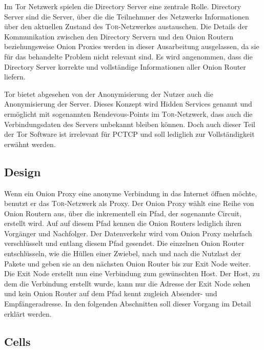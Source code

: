 \documentclass[fleqn,envcountsame,runningheads,10pt,a4paper]{llncs}
\begin{document}
Im Tor Netzwerk spielen die Directory Server eine zentrale Rolle.
Directory Server sind die Server, über die die Teilnehmner des Netzwerks Informationen über den aktuellen Zustand des \textsc{Tor}-Netzwerkes austauschen.
Die Details der Kommunikation zwischen den Directory Servern und den Onion Routern beziehungsweise Onion Proxies werden in dieser Ausarbeitung ausgelassen, da sie für das behandelte Problem nicht relevant sind.
Es wird angenommen, dass die Directory Server korrekte und vollständige Informationen aller Onion Router liefern.

Tor bietet abgesehen von der Anonymisierung der Nutzer auch die Anonymisierung der Server. 
Dieses Konzept wird Hidden Services genannt und ermöglicht mit sogenannten Rendevous-Points im \textsc{Tor}-Netzwerk, dass auch die Verbindungsdaten des Servers unbekannt bleiben können.
Doch auch dieser Teil der Tor Software ist irrelevant für PCTCP und soll lediglich zur Vollständigkeit erwähnt werden.



\subsection{Design}

Wenn ein Onion Proxy eine anonyme Verbindung in das Internet öffnen möchte, benutzt er das \textsc{Tor}-Netzwerk als Proxy. Der Onion Proxy wählt eine Reihe von Onion Routern aus, über die inkrementell ein Pfad, der sogenannte Circuit, erstellt wird. Auf auf diesem Pfad kennen die Onion Routers lediglich ihren Vorgänger und Nachfolger. Der Datenverkehr wird vom Onion Proxy mehrfach verschlüsselt und entlang diesem Pfad gesendet. Die einzelnen Onion Router entschlüsseln, wie die Hüllen einer Zwiebel, nach und nach die Nutzlast der Pakete und geben sie an den nächsten Onion Router bis zur Exit Node weiter. Die Exit Node erstellt nun eine Verbindung zum gewünschten Host. Der Host, zu dem die Verbindung erstellt wurde, kann nur die Adresse der Exit Node sehen und kein Onion Router auf dem Pfad kennt zugleich Absender- und Empfängeradresse. In den folgenden Abschnitten soll dieser Vorgang im Detail erklärt werden.

\subsection{Cells}
\end{document}
